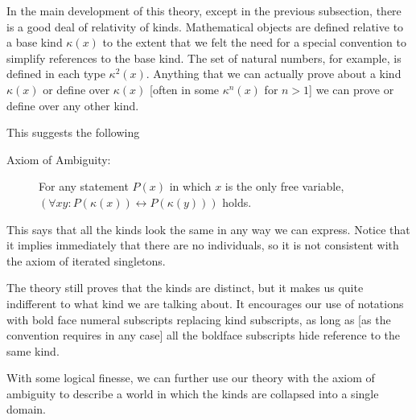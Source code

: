 \documentclass[12pt]{article}
\begin{document}
In the main development of this theory, except in the previous subsection, there is a good deal of relativity of kinds.  Mathematical objects are defined relative to a base kind $\kappa(x)$ to the extent that we felt the need for a special convention to simplify references to the base kind.  The set of natural numbers, for example, is defined
in each type $\kappa^2(x)$.  Anything that we can actually prove about a kind $\kappa(x)$ or define over $\kappa(x)$ [often in some $\kappa^n(x)$ for $n>1$] we can prove or define over any other kind.

This suggests the following

\begin{description}

\item[Axiom of Ambiguity:]  For any statement $P(x)$ in which $x$ is the only free variable, $(\forall xy:P(\kappa(x)) \leftrightarrow P(\kappa(y)))$ holds.

\end{description}

This says that all the kinds look the same in any way we can express.  Notice that it implies immediately that there are no individuals, so it is not consistent with the axiom of iterated singletons.

The theory still proves that the kinds are distinct, but it makes us quite indifferent to what kind we are talking about.  It encourages our use of notations with bold face numeral subscripts replacing kind subscripts, as long as [as the convention requires in any case] all the boldface subscripts hide reference to the same kind.

With some logical finesse, we can further use our theory with the axiom of ambiguity to describe a world in which the kinds are collapsed into a single domain.
\end{document}
